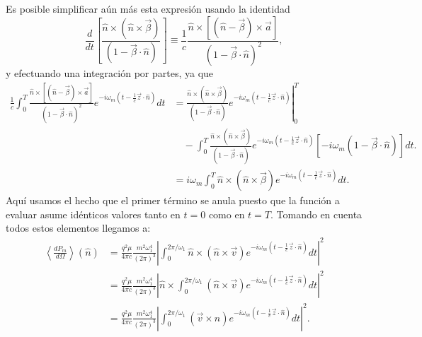 Es posible simplificar aún más esta expresión usando la identidad
\begin{equation}
\frac{d}{dt}\left[ \frac{\hat{n}\times\left(  \hat{n}\times\vec{\beta}\right)
}{\left(  1-\vec{\beta}\cdot\hat{n}\right)  }\right] \equiv\frac{1}{c}
\frac{\hat{n}\times\left[
\left(  \hat{n}-\vec{\beta}\right)  \times\vec{a}\right]
}{\left(  1-\vec{\beta}\cdot\hat{n}\right)^2}, \label{iddt1}
\end{equation}
y efectuando una integración por partes, ya que
\begin{align}
\frac{1}{c}\int_0^{T}\frac{\hat{n}\times\left[\left(\hat{n}-\vec{\beta}\right)
\times\vec{a}\right]}{\left(1-\vec{\beta}\cdot\hat{n}\right)^2} e^{-i\omega_{m}\left(t-\frac{1}{c}\vec{z}\cdot\hat{n}\right)}dt
&= \left.\frac{\hat{n}\times\left(\hat{n}\times\vec{\beta}\right)
}{\left(1-\vec{\beta}\cdot\hat{n}\right)} e^{-i\omega_{m}\left(t-\frac{1}{c}\vec{z}\cdot\hat{n}\right)  }\right|^T_0
\nonumber\\
&\quad- \int_0^{T}\frac{\hat{n}\times\left(
\hat{n}\times\vec{\beta}\right)}{\left(  1-\vec{\beta}\cdot\hat{n}\right) }
e^{-i\omega_{m}\left(t-\frac{1}{c}\vec{z}\cdot\hat{n}\right)} \left[-i\omega_m(1-\vec{\beta}\cdot\hat{n})\right] dt. \\
&=i\omega_m \int_0^{T}\hat{n}\times\left(\hat{n}\times\vec{\beta}\right)
e^{-i\omega_{m}\left(t-\frac{1}{c}\vec{z}\cdot\hat{n}\right)  }dt.
\end{align}
Aquí usamos el hecho que el primer término se anula puesto que la función a evaluar asume
idénticos valores tanto en $t=0$ como en $t=T$. Tomando en cuenta todos estos
elementos llegamos a:
\begin{align}
\left\langle \frac{dP_{m}}{d\Omega}\right\rangle (\hat{n}) &
=\frac{q^2\mu}{4\pi c}\frac{m^2\omega_1^4}{\left(2\pi\right)^3}\left|\int_0^{2\pi/\omega_1}\hat{n}\times\left(\hat{n}\times\vec{v}\right)
e^{-i\omega_{m}\left(t-\frac{1}{c}\vec{z}\cdot\hat{n}\right)}dt \right|^2\\
&=\frac{q^2\mu}{4\pi c}\frac{m^2\omega_1^4}{\left(2\pi\right)^3}\left|
\hat{n}\times\int_0^{2\pi/\omega_1}\left(  \hat{n}\times\vec{v}\right)
e^{-i\omega_{m}\left(t-\frac{1}{c}\vec{z}\cdot\hat{n}\right)  }dt \right|^2\\
&=\frac{q^2\mu}{4\pi c}\frac{m^2\omega_1^4}{\left(2\pi\right)^3}\left|
\int_0^{2\pi/\omega_1}\left(  \vec{v}\times\hat{n}\right)  e^{-i\omega
_{m}\left(t-\frac{1}{c}\vec{z}\cdot\hat{n}\right) }dt \right|^2.
\end{align}

